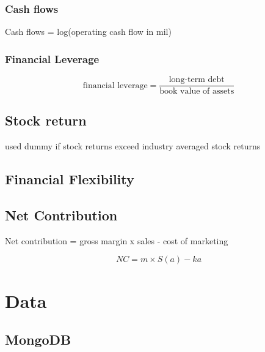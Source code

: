 \documentclass[
]{book}
\begin{document}
\hypertarget{cash-flows}{%
\subsection{Cash flows}\label{cash-flows}}

\citep{Chakravarty_2011, Malshe_2015} Cash flows = log(operating cash flow in mil)

\hypertarget{financial-leverage}{%
\subsection{Financial Leverage}\label{financial-leverage}}

\citep{Kashmiri_2017, Chakravarty_2011}

\[
\text{financial leverage} = \frac{\text{long-term debt}}{\text{book value of assets}}
\]

\hypertarget{stock-return}{%
\section{Stock return}\label{stock-return}}

\citep{Markovitch_2005, Chakravarty_2011, Chakravarty_2016} used dummy if stock returns exceed industry averaged stock
returns

\hypertarget{financial-flexibility-1}{%
\section{Financial Flexibility}\label{financial-flexibility-1}}

\hypertarget{net-contribution}{%
\section{Net Contribution}\label{net-contribution}}

Net contribution = gross margin x sales - cost of marketing

\[
NC = m \times S(a) -ka
\]

\hypertarget{data}{%
\chapter{Data}\label{data}}

\hypertarget{mongodb}{%
\section{MongoDB}\label{mongodb}}
\end{document}
